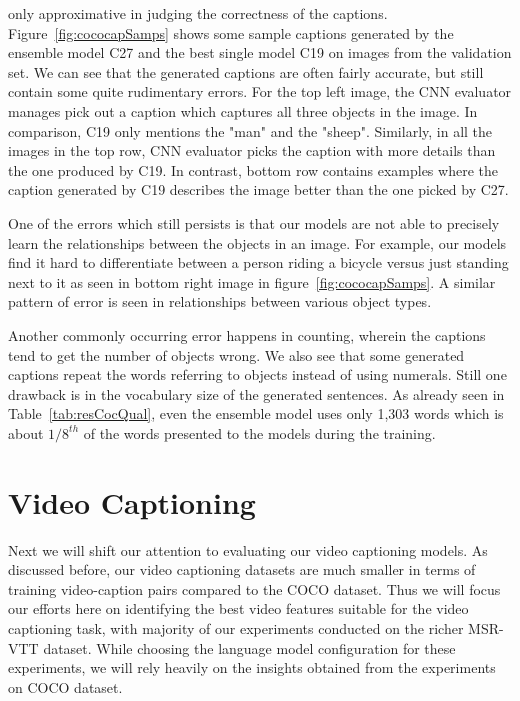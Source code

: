 only approximative in judging the correctness of the captions.
Figure~\ref{fig:cococapSamps} shows some sample captions generated by the
ensemble model C27 and the best single model C19 on images from the validation
set.
We can see that the generated captions are often fairly accurate, but still
contain some quite rudimentary errors.
For the top left image, the CNN evaluator manages pick out a caption which
captures all three objects in the image.
In comparison, C19 only mentions the "man" and the "sheep".
Similarly, in all the images in the top row, CNN evaluator picks the caption
with more details than the one produced by C19.
In contrast, bottom row contains examples where the caption generated by C19
describes the image better than the one picked by C27.

One of the errors which still persists is that our models are not able to
precisely learn the relationships between the objects in an image.
For example, our models find it hard to differentiate between a person riding a
bicycle versus just standing next to it as seen in bottom right image in
figure~\ref{fig:cococapSamps}.
A similar pattern of error is seen in relationships between various object
types.

Another commonly occurring error happens in counting, wherein the captions tend
to get the number of objects wrong.
We also see that some generated captions repeat the words referring to objects
instead of using numerals.
Still one drawback is in the vocabulary size of the generated sentences.
As already seen in Table~\ref{tab:resCocQual}, even the ensemble model uses only
1,303 words which is about $1/8^{th}$ of the words presented to the models
during the training.

\section{Video Captioning}
Next we will shift our attention to evaluating our video captioning models.
As discussed before, our video captioning datasets are much smaller in terms of
training video-caption pairs compared to the COCO dataset.
Thus we will focus our efforts here on identifying the best video features
suitable for the video captioning task, with majority of our experiments
conducted on the richer MSR-VTT dataset.
While choosing the language model configuration for these experiments, we will
rely heavily on the insights obtained from the experiments on COCO dataset.

